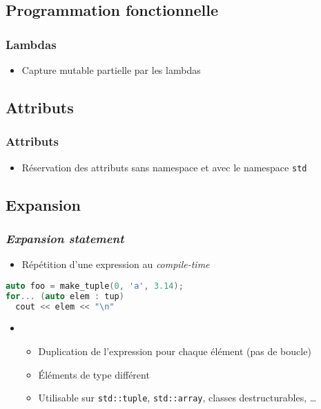 \documentclass[C++.tex]{subfiles}
\begin{document}
\subsection*{Programmation fonctionnelle}
\begin{frame}[fragile]
	\frametitle{Lambdas}
	\begin{itemize}
		\item Capture mutable partielle par les lambdas

	\end{itemize}
\end{frame}

\subsection*{Attributs}
\begin{frame}[fragile]
	\frametitle{Attributs}
	\begin{itemize}
		\item Réservation des attributs sans namespace et avec le namespace \lstinline|std|

	\end{itemize}
\end{frame}

\subsection*{Expansion}
\begin{frame}[fragile]
	\frametitle{\textit{Expansion statement}}
	\begin{itemize}
		\item Répétition d'une expression au \textit{compile-time}
	\end{itemize}

	\begin{lstlisting}[language=C++]
auto foo = make_tuple(0, 'a', 3.14);
for... (auto elem : tup)  
  cout << elem << "\n"\end{lstlisting}

	\begin{itemize}
		\item [] 
		\begin{itemize}
			\item Duplication de l'expression pour chaque élément (pas de boucle)
			\item Éléments de type différent
			\item Utilisable sur \lstinline|std::tuple|, \lstinline|std::array|, classes destructurables, \ldots{}
		\end{itemize}
	\end{itemize}
\end{frame}
\end{document}
